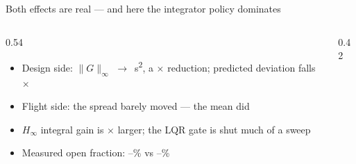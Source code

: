 \documentclass[aspectratio=169,11pt,t]{beamer}
\begin{document}
\begin{frame}{Both effects are real --- and here the integrator policy dominates}
  \label{q:atten}
  \begin{columns}[T,onlytextwidth]
    \begin{column}{0.54\textwidth}
      \begin{itemize}\bulletgap\small
        \item Design side: $\|G\|_\infty$ \HnormLqr{} $\rightarrow$ \HnormHinf\,s\textsuperscript{2},
              a \HnormRatio$\times$ reduction; predicted deviation falls \SigxRatio$\times$
        \item Flight side: the spread barely moved --- the mean did
        \item $H_\infty$ integral gain is \KiRatio$\times$ larger; the LQR gate is
              shut much of a sweep
        \item Measured open fraction: \IntegWinLqrMin--\IntegWinLqrMax\% vs
              \IntegWinHinfMin--\IntegWinHinfMax\%
      \end{itemize}
    \end{column}
    \begin{column}{0.42\textwidth}
      \setlength{\figmaxh}{38mm}
    \end{column}
  \end{columns}
\end{frame}
\end{document}
